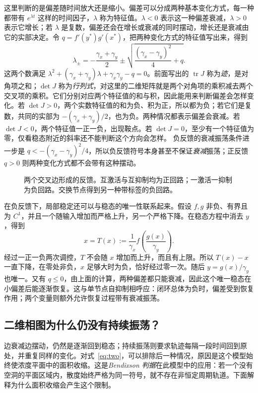 \documentclass[11pt,a4paper,UTF8,fontset=fandol]{ctexart}
\begin{document}
这里判断的是偏差随时间放大还是缩小。偏差可以分成两种基本变化方式，每一种都带有 $e^{\lambda t}$ 这样的时间因子，$\lambda$ 称为特征值。$\lambda<0$ 表示这一种偏差衰减，$\lambda>0$ 表示它增长；若 $\lambda$ 是复数，偏差还会在增长或衰减的同时摆动，增长还是衰减由它的实部决定。令 $q=f'(y^*)g'(x^*)$，把两种变化方式的特征值写出来，得到
\[
\lambda_{\pm}=-\frac{\gamma_x+\gamma_y}{2}
\pm\sqrt{\frac{(\gamma_x-\gamma_y)^2}{4}+q}.
\]
这两个数满足 $\lambda^2+(\gamma_x+\gamma_y)\lambda+\gamma_x\gamma_y-q=0$。前面写出的 $\operatorname{tr}J$ 称为\emph{迹}，是对角项之和；$\det J$ 称为\emph{行列式}，对这里的二维矩阵就是两个对角项的乘积减去两个交叉项的乘积。它们分别对应两个特征值的和与积，因此能用来判断偏差会怎样变化。若 $\det J>0$，两个实数特征值的和为负、积为正，所以都为负；若它们是复数，共同的实部为 $-(\gamma_x+\gamma_y)/2$，也为负。两种情况都表示偏差会衰减。若 $\det J<0$，两个特征值一正一负，出现鞍点。若 $\det J=0$，至少有一个特征值为零，仅看稳态附近的斜率还不能判断这个方向会怎样。
负反馈的衰减振荡条件进一步是
$q<-(\gamma_x-\gamma_y)^2/4$，所以负反馈符号本身甚至不保证\emph{衰减}振荡；正反馈 $q>0$ 则两种变化方式都不会带有这种摆动。
\begin{figure}[H]\centering
{}
\caption{两个交叉边形成的反馈。互激活与互抑制均为正回路；一激活一抑制为负回路。交换节点得到另一种带标签的负回路。}
\end{figure}

在负反馈下，局部稳定还可以与稳态的唯一性联系起来。假设 $f,g$ 非负、有界且为 $C^1$，并且一个随输入增加而严格上升，另一个严格下降。在稳态方程中消去 $y$，得到
\[
x=T(x):=\frac1{\gamma_x}f\!\left(\frac{g(x)}{\gamma_y}\right).
\]
经过一正一负两次调控，$T$ 不会随 $x$ 增加而上升，而且有上限。所以 $T(x)-x$ 一直下降，在零处非负，$x$ 足够大时为负，恰好经过零一次。随后 $y=g(x)/\gamma_y$ 也唯一。又有 $q\leq0$，由上面的计算，两种偏差都只能衰减，因此这个唯一稳态在小偏差后能逐渐恢复。这与单节点自抑制相呼应：闭环总体为负时，偏差受到恢复作用；两个变量则额外允许恢复过程带有衰减振荡。

\subsection{二维相图为什么仍没有持续振荡？}
边衰减边摆动，仍然是逐渐回到稳态；持续振荡则要求轨迹每隔一段时间回到原处，并重复同样的变化。对式~\eqref{eq:two}，可以排除后一种情况，原因是这个模型始终使浓度平面中的面积收缩。这是\emph{Bendixson 判据}在此模型中的应用：若一个没有空洞的平面区域内，散度始终严格为同一符号，就不存在非恒定周期轨道。下面解释为什么面积收缩会产生这个限制。
\end{document}
